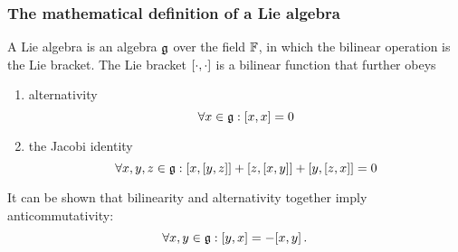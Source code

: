     \subsubsection{The mathematical definition of a Lie algebra}
        A Lie algebra is an algebra $\operatorname{\mathfrak{g}}$ over the field $\mathbb{F}$, in which the bilinear operation is the Lie bracket. The Lie bracket $\comm{\cdot}{\cdot}$ is a bilinear function that further obeys
        \begin{enumerate}
            \item alternativity
            \begin{equation}
                \forall x \in \glie: \comm{x}{x} = 0
            \end{equation}

            \item the Jacobi identity
            \begin{equation}
                \forall x, y, z \in \glie: \comm{x}{\comm{y}{z}} + \comm{z}{\comm{x}{y}} + \comm{y}{\comm{z}{x}} = 0
            \end{equation}
        \end{enumerate}

        It can be shown that bilinearity and alternativity together imply anticommutativity:
        \begin{equation}
            \forall x, y \in \glie: \comm{y}{x} = - \comm{x}{y} \thinspace .
        \end{equation}
